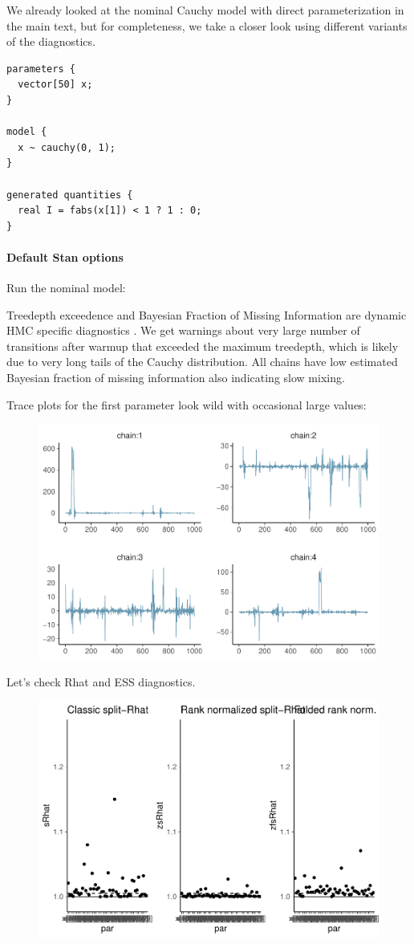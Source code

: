 \documentclass[american,]{article}
\let\oldparagraph\paragraph
\renewcommand{\paragraph}[1]{\oldparagraph{#1}\mbox{}}
\begin{document}
We already looked at the nominal Cauchy model with direct
parameterization in the main text, but for completeness, we take a
closer look using different variants of the diagnostics.

\begin{verbatim}
parameters {
  vector[50] x;
}

model {
  x ~ cauchy(0, 1);
}

generated quantities {
  real I = fabs(x[1]) < 1 ? 1 : 0;
}
\end{verbatim}

\hypertarget{default-stan-options-1}{%
\paragraph{Default Stan options}\label{default-stan-options-1}}

Run the nominal model:

Treedepth exceedence and Bayesian Fraction of Missing Information are
dynamic HMC specific diagnostics \citep{betancourt2017conceptual}. We
get warnings about very large number of transitions after warmup that
exceeded the maximum treedepth, which is likely due to very long tails
of the Cauchy distribution. All chains have low estimated Bayesian
fraction of missing information also indicating slow mixing.

Trace plots for the first parameter look wild with occasional large
values:

\begin{figure}[tp]
  \centering
  \includegraphics[width=0.6\linewidth]{graphics/trace-fit-nom-1.pdf}
\end{figure}

Let's check Rhat and ESS diagnostics.

\begin{figure}[tp]
  \centering
  \includegraphics[width=0.6\linewidth]{graphics/rhat-fit-nom-1.pdf}
\end{figure}
\end{document}
